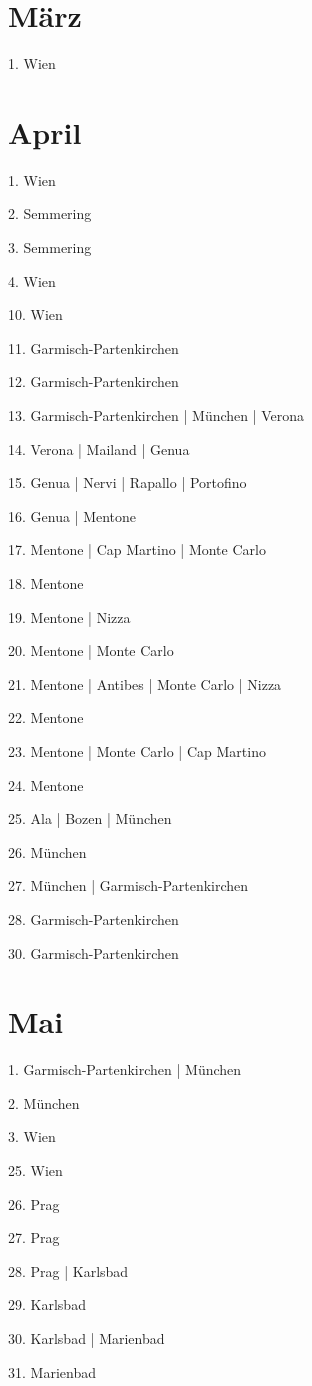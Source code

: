 \documentclass[twoside=false,titlepage=false,open=any, parskip=never, fontsize=10pt, headings=small, chapterprefix=false, appendixprefix=false, DIV=15]{scrbook}
\begin{document}
\begin{multicols}{3}
            \section*{März}
            1. Wien\par
            \section*{April}
            1. Wien\par
            2. Semmering\par
            3. Semmering\par
            4. Wien\par
            10. Wien\par
            11. Garmisch-Partenkirchen\par
            12. Garmisch-Partenkirchen\par
            13. Garmisch-Partenkirchen | München | Verona\par
            14. Verona | Mailand | Genua\par
            15. Genua | Nervi | Rapallo | Portofino\par
            16. Genua | Mentone\par
            17. Mentone | Cap Martino | Monte Carlo\par
            18. Mentone\par
            19. Mentone | Nizza\par
            20. Mentone | Monte Carlo\par
            21. Mentone | Antibes | Monte Carlo | Nizza\par
            22. Mentone\par
            23. Mentone | Monte Carlo | Cap Martino\par
            24. Mentone\par
            25. Ala | Bozen | München\par
            26. München\par
            27. München | Garmisch-Partenkirchen\par
            28. Garmisch-Partenkirchen\par
            30. Garmisch-Partenkirchen\par
            \section*{Mai}
            1. Garmisch-Partenkirchen | München\par
            2. München\par
            3. Wien\par
            25. Wien\par
            26. Prag\par
            27. Prag\par
            28. Prag | Karlsbad\par
            29. Karlsbad\par
            30. Karlsbad | Marienbad\par
            31. Marienbad\par

\end{multicols}
\end{document}
